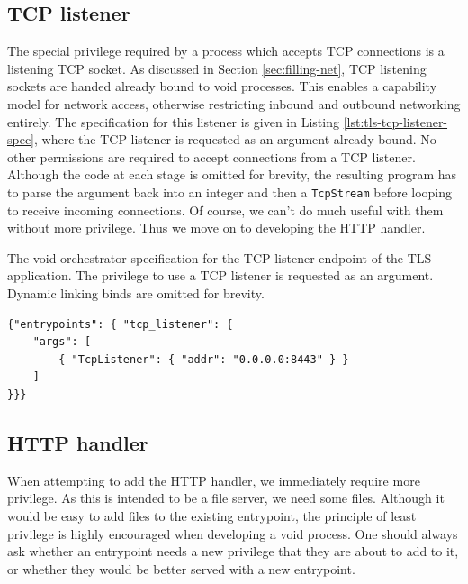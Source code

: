 \documentclass[12pt,a4paper,twoside]{report}
\begin{document}
\subsection{TCP listener}
\label{sec:building-tls-tcp-listener}

The special privilege required by a process which accepts TCP connections is a listening TCP socket. As discussed in Section \ref{sec:filling-net}, TCP listening sockets are handed already bound to void processes. This enables a capability model for network access, otherwise restricting inbound and outbound networking entirely. The specification for this listener is given in Listing \ref{lst:tls-tcp-listener-spec}, where the TCP listener is requested as an argument already bound. No other permissions are required to accept connections from a TCP listener. Although the code at each stage is omitted for brevity, the resulting program has to parse the argument back into an integer and then a \texttt{TcpStream} before looping to receive incoming connections. Of course, we can't do much useful with them without more privilege. Thus we move on to developing the HTTP handler.

\begin{listing}
\label{lst:tls-tcp-listener-spec}
\caption{The void orchestrator specification for the TCP listener endpoint of the TLS application. The privilege to use a TCP listener is requested as an argument. Dynamic linking binds are omitted for brevity.}

\begin{verbatim}
{"entrypoints": { "tcp_listener": {
	"args": [
		{ "TcpListener": { "addr": "0.0.0.0:8443" } }
	]
}}}
\end{verbatim}
\end{listing}

\subsection{HTTP handler}
\label{sec:building-tls-http-handler}

When attempting to add the HTTP handler, we immediately require more privilege. As this is intended to be a file server, we need some files. Although it would be easy to add files to the existing entrypoint, the principle of least privilege is highly encouraged when developing a void process. One should always ask whether an entrypoint needs a new privilege that they are about to add to it, or whether they would be better served with a new entrypoint.
\end{document}
